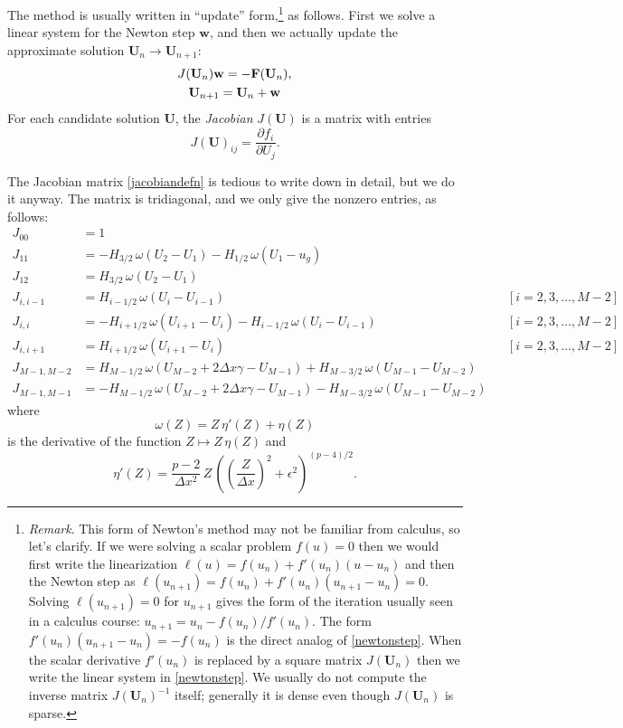 \documentclass[11pt,final,reqno]{amsart}
\newcommand{\eps}{\epsilon}
\newcommand{\bbF}{\mathbf{F}}
\newcommand{\bU}{\mathbf{U}}
\newcommand{\bw}{\mathbf{w}}
\begin{document}
The method is usually written in ``update'' form,\footnote{\textsl{Remark}.  This form of Newton's method may not be familiar from calculus, so let's clarify.  If we were solving a scalar problem $f(u)=0$ then we would first write the linearization $\ell(u)=f(u_n) + f'(u_n)(u-u_n)$ and then the Newton step as $\ell(u_{n+1}) = f(u_n) + f'(u_n) (u_{n+1}-u_n) = 0$.  Solving $\ell(u_{n+1}) = 0$ for $u_{n+1}$ gives the form of the iteration usually seen in a calculus course: $u_{n+1} = u_n - f(u_n)/f'(u_n)$.  The form $f'(u_n) (u_{n+1} - u_n) = -f(u_n)$ is the direct analog of \eqref{newtonstep}.  When the scalar derivative $f'(u_n)$ is replaced by a square matrix $J(\bU_n)$ then we write the linear system in \eqref{newtonstep}.  We usually do not compute the inverse matrix $J(\bU_n)^{-1}$ itself; generally it is dense even though $J(\bU_n)$ is sparse.} as follows.  First we solve a linear system for the Newton step $\bw$, and then we actually update the approximate solution $\bU_n \to \bU_{n+1}$:
\begin{gather}
J(\bU_n) \bw = - \bbF(\bU_n), \label{newtonstep} \\
\bU_{n+1} = \bU_n + \bw \notag
\end{gather}
For each candidate solution $\bU$, the \emph{Jacobian} $J(\bU)$ is a matrix with entries
\begin{equation} \label{jacobiandefn}
J(\bU)_{ij} = \frac{\partial f_i}{\partial U_j}.
\end{equation}

The Jacobian matrix \eqref{jacobiandefn} is tedious to write down in detail, but we do it anyway.  The matrix is tridiagonal, and we only give the nonzero entries, as follows:
\begin{align*}
J_{00} &= 1 \\
J_{11} &= - H_{3/2}\, \omega(U_2-U_1) - H_{1/2}\, \omega(U_1-u_g) \\
J_{12} &= H_{3/2}\, \omega(U_2-U_1) \\
J_{i,i-1} &= H_{i-1/2}\, \omega(U_i-U_{i-1}) &&[i=2,3,\dots,M-2] \\
J_{i,i} &= - H_{i+1/2}\, \omega(U_{i+1}-U_i) - H_{i-1/2}\, \omega(U_i-U_{i-1}) &&[i=2,3,\dots,M-2] \\
J_{i,i+1} &= H_{i+1/2}\, \omega(U_{i+1}-U_i)  &&[i=2,3,\dots,M-2] \\
J_{M-1,M-2} &= H_{M-1/2}\, \omega(U_{M-2}+2\Delta x \gamma - U_{M-1}) + H_{M-3/2}\, \omega(U_{M-1}-U_{M-2}) \\
J_{M-1,M-1} &= - H_{M-1/2}\, \omega(U_{M-2}+2\Delta x \gamma - U_{M-1}) - H_{M-3/2}\, \omega(U_{M-1}-U_{M-2})
\end{align*}
where
	$$\omega(Z) = Z\, \eta'(Z) + \eta(Z)$$
is the derivative of the function $Z \mapsto Z\, \eta(Z)$ and
	$$\eta'(Z) = \frac{p-2}{\Delta x^2}\, Z\, \left(\left(\frac{Z}{\Delta x}\right)^2 + \eps^2\right)^{(p-4)/2}.$$
\end{document}
